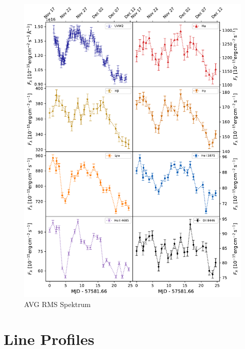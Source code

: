 \begin{figure}[!ht]
	\centering
	\includegraphics[width=1\textwidth]{pictures/Chapter4/lightcurves/NGC4593_Lines_UVW2.pdf}
	\caption{AVG RMS Spektrum}
	\label{fig:emission_line_lightcurves}
\end{figure}





\section{Line Profiles}

